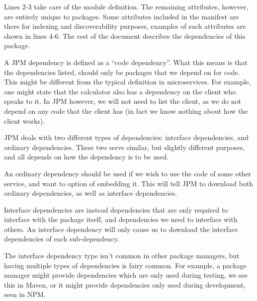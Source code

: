 Lines 2-3 take care of the module definition. The remaining attributes,
however, are entirely unique to packages. Some attributes included in the
manifest are there for indexing and discoverability purposes, examples of such
attributes are shown in lines 4-6. The rest of the document describes the
dependencies of this package.

A JPM dependency is defined as a ``code dependency''. What this means is that
the dependencies listed, should only be packages that we depend on for code.
This might be different from the typical definition in microservices. For
example, one might state that the calculator also has a dependency on the
client who speaks to it. In JPM however, we will not need to list the client,
as we do not depend on any code that the client has (in fact we know nothing
about how the client works).

JPM deals with two different types of dependencies: interface dependencies, and
ordinary dependencies. These two serve similar, but slightly different
purposes, and all depends on how the dependency is to be used.

An ordinary dependency should be used if we wish to use the code of some other
service, and want to option of embedding it. This will tell JPM to download
both ordinary dependencies, as well as interface dependencies.

Interface dependencies are instead dependencies that are only required to
interface with the package itself, and dependencies we need to interface with
others. An interface dependency will only cause us to download the interface
dependencies of each sub-dependency.


The interface dependency type isn't common in other package managers, but
having multiple types of dependencies is fairy common.  For example, a package
manager might provide dependencies which are only used during testing, we see
this in Maven, or it might provide dependencies only used during development,
seen in NPM.

